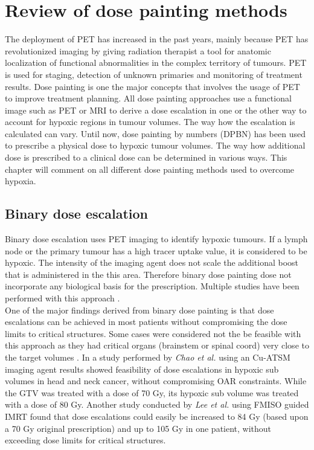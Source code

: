 \section{Review of dose painting methods}
The deployment of PET has increased in the past years, mainly because PET has revolutionized imaging by giving radiation therapist a tool for anatomic localization of functional abnormalities in the complex territory of tumours. PET is used for staging, detection of unknown primaries and monitoring of treatment results. Dose painting is one the major concepts that involves the usage of PET to improve treatment planning. All dose painting approaches use a functional image such as PET or MRI to derive a dose escalation in one or the other way to account for hypoxic regions in tumour volumes. The way how the escalation is calculated can vary. Until now, dose painting by numbers (DPBN) has been used to prescribe a physical dose to hypoxic tumour volumes. The way how additional dose is prescribed to a clinical dose can be determined in various ways. This chapter will comment on all different dose painting methods used to overcome hypoxia.
\subsection{Binary dose escalation}
Binary dose escalation uses PET imaging to identify hypoxic tumours. If a lymph node or the primary tumour has a high tracer uptake value, it is considered to be hypoxic. The intensity of the imaging agent does not scale the additional boost that is administered in the this area. Therefore binary dose painting dose not incorporate any biological basis for the prescription. Multiple studies have been performed with this approach \cite{pmid20855118, pmid11240261, pmid17869020, pmid19203843}.\\One of the major findings derived from binary dose painting is that dose escalations can be achieved in most patients without compromising the dose limits to critical structures. Some cases were considered not the be feasible with this approach as they had critical organs (brainstem or spinal coord) very close to the target volumes \cite{pmid20855118}. In a study performed by \textit{Chao et al.} \cite{pmid11240261} using an Cu-ATSM imaging agent results showed feasibility of dose escalations in hypoxic sub volumes in head and neck cancer, without compromising OAR constraints. While the GTV was treated with a dose of 70 Gy, its hypoxic sub volume was treated with a dose of 80 Gy. Another study conducted by \textit{Lee et al.} \cite{pmid17869020} using FMISO guided IMRT found that dose escalations could easily be increased to 84 Gy (based upon a 70 Gy original prescription) and up to 105 Gy in one patient, without exceeding dose limits for critical structures. 

